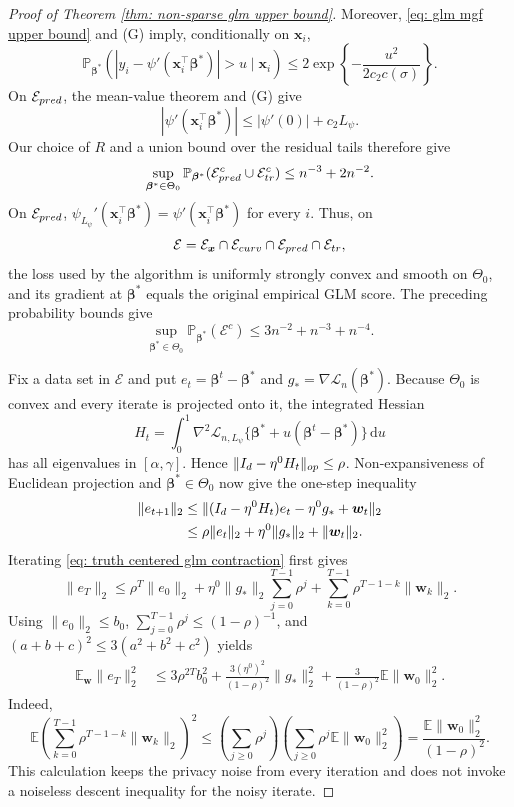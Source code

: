 \documentclass[letterpaper,12pt]{article}
\renewcommand{\d}{\mathrm{d}}
\numberwithin{equation}{section}
\theoremstyle{plain}
\numberwithin{Theorem}{section}
\numberwithin{proposition}{section}
\numberwithin{Lemma}{section}
{
	\theoremstyle{definition}
	\newtheorem{Definition}{Definition}
	\newtheorem{example}{Example}
	\numberwithin{example}{section}
	\newtheorem{fact}{Fact}
	\numberwithin{fact}{section}
	\newtheorem{remark}{Remark}
}
\newcommand{\Pro}{\mathbb{P}}
\newcommand{\1}{\mathbbm{1}}
\def\bbeta{{\boldsymbol{\beta}}}
\def\Pr{\mathbb P}
\def\E{\mathbb{E}}
\def\L{{\mathcal L}}
\begin{document}
{\begin{proof}[Proof of Theorem \ref{thm: non-sparse glm upper bound}]
	Moreover, \eqref{eq: glm mgf upper bound} and (G) imply,
	conditionally on $\bm x_i$,
	\[
	\Pro_{\bbeta^*}\!\left(
	|y_i-\psi'(\bm x_i^\top\bbeta^*)|>u\mid\bm x_i\right)
	\leq2\exp\!\left\{-\frac{u^2}{2c_2c(\sigma)}\right\}.
	\]
	On $\mathcal E_{\rm pred}$, the mean-value theorem and (G) give
	\[
	|\psi'(\bm x_i^\top\bbeta^*)|
	\leq|\psi'(0)|+c_2L_\psi.
	\]
	Our choice of $R$ and a union bound over the residual tails therefore
	give
	\[
	\sup_{\bbeta^*\in\Theta_0}
	\Pr_{\bbeta^*}(\mathcal E_{\rm pred}^c\cup
	\mathcal E_{\rm tr}^c)\leq n^{-3}+2n^{-2}.
	\]
	On $\mathcal E_{\rm pred}$,
	$\psi_{L_\psi}'(\bm x_i^\top\bbeta^*)
	=\psi'(\bm x_i^\top\bbeta^*)$ for every $i$. Thus, on
	\[
	\mathcal E=\mathcal E_{\bm x}\cap\mathcal E_{\rm curv}
	\cap\mathcal E_{\rm pred}\cap\mathcal E_{\rm tr},
	\]
	the loss used by the algorithm is uniformly strongly convex and
	smooth on $\Theta_0$, and its gradient at $\bbeta^*$ equals the
	original empirical GLM score. The preceding probability bounds give
	\begin{equation}
	\sup_{\bbeta^*\in\Theta_0}\Pr_{\bbeta^*}(\mathcal E^c)
	\leq3n^{-2}+n^{-3}+n^{-4}.                           \label{eq: low dim good event probability}
	\end{equation}

	Fix a data set in $\mathcal E$ and put
	$e_t=\bbeta^t-\bbeta^*$ and $g_*=\nabla\L_n(\bbeta^*)$.
	Because $\Theta_0$ is convex and every iterate is projected onto it, the integrated Hessian
	\[
	H_t=\int_0^1\nabla^2\L_{n,L_\psi}
	\{\bbeta^*+u(\bbeta^t-\bbeta^*)\}\,\d u
	\]
	has all eigenvalues in $[\alpha,\gamma]$.  Hence
	$\|I_d-\eta^0H_t\|_{\rm op}\leq\rho$.  Non-expansiveness of Euclidean projection and $\bbeta^*\in\Theta_0$ now give the one-step inequality
	\begin{align}\label{eq: truth centered glm contraction}
	\|e_{t+1}\|_2
	&\leq\|(I_d-\eta^0H_t)e_t-\eta^0g_*+\bm w_t\|_2\\
	&\leq\rho\|e_t\|_2+\eta^0\|g_*\|_2+\|\bm w_t\|_2.\notag
	\end{align}
		Iterating \eqref{eq: truth centered glm contraction} first gives
		\[
		\|e_T\|_2\leq \rho^T\|e_0\|_2
		+\eta^0\|g_*\|_2\sum_{j=0}^{T-1}\rho^j
		+\sum_{k=0}^{T-1}\rho^{T-1-k}\|\bm w_k\|_2.
		\]
		Using $\|e_0\|_2\leq b_0$, $\sum_{j=0}^{T-1}\rho^j\leq(1-\rho)^{-1}$, and $(a+b+c)^2\leq3(a^2+b^2+c^2)$ yields
	\begin{align}\label{eq: glm expected contraction}
	\E_{\bm w}\|e_T\|_2^2
	&\leq 3\rho^{2T}b_0^2+
	\frac{3(\eta^0)^2}{(1-\rho)^2}\|g_*\|_2^2
	+\frac{3}{(1-\rho)^2}\E\|\bm w_0\|_2^2.
	\end{align}
	Indeed,
	\[
	\E\left(\sum_{k=0}^{T-1}\rho^{T-1-k}\|\bm w_k\|_2\right)^2
	\leq\left(\sum_{j\geq0}\rho^j\right)
	\left(\sum_{j\geq0}\rho^j\E\|\bm w_0\|_2^2\right)
	=\frac{\E\|\bm w_0\|_2^2}{(1-\rho)^2}.
	\]
	This calculation keeps the privacy noise from every iteration and does not invoke a noiseless descent inequality for the noisy iterate.


\end{proof}}
\end{document}

